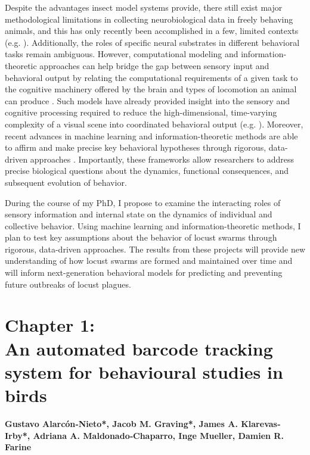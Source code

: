 \documentclass[11pt,a4paper,oneside]{article}
\begin{document}
	Despite the advantages insect model systems provide, there still exist major methodological limitations in collecting neurobiological data in freely behaving animals, and this has only recently been accomplished in a few, limited contexts (e.g. \citealp{martin2015central}). Additionally, the roles of specific neural substrates in different behavioral tasks remain ambiguous. However, computational modeling and information-theoretic approaches can help bridge the gap between sensory input and behavioral output by relating the computational requirements of a given task to the cognitive machinery offered by the brain and types of locomotion an animal can produce \citep{webb2016neural}. Such models have already provided insight into the sensory and cognitive processing required to reduce the high-dimensional, time-varying complexity of a visual scene into coordinated behavioral output (e.g. \citealp{bertrand2015bio,mischiati2015internal}). Moreover, recent advances in machine learning and information-theoretic methods are able to affirm and make precise key behavioral hypotheses through rigorous, data-driven approaches \citep{berman2014drosopholid,berman2014mapping,berman2016predictability,klibaite2017unsupervised,todd2017exploration,wiltschko2015,twomey2016vision}. Importantly, these frameworks allow researchers to address precise biological questions about the dynamics, functional consequences, and subsequent evolution of behavior. 
	\par
	During the course of my PhD, I propose to examine the interacting roles of sensory information and internal state on the dynamics of individual and collective behavior. Using machine learning and information-theoretic methods, I plan to test key assumptions about the behavior of locust swarms through rigorous, data-driven approaches. The results from these projects will provide new understanding of how locust swarms are formed and maintained over time and will inform next-generation behavioral models for predicting and preventing future outbreaks of locust plagues.

\newpage 
	\section[Chapter 1: An automated barcode tracking system]{\LARGE{Chapter 1:} \\ \Large{An automated barcode tracking system for behavioural studies in birds}}
	\vspace{5mm}
	\textbf{Gustavo Alarcón‐Nieto*, Jacob M. Graving*, James A. Klarevas‐Irby*, Adriana A. Maldonado‐Chaparro, Inge Mueller, Damien R. Farine} \\
\end{document}
